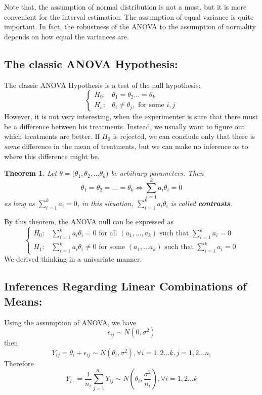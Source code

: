 \documentclass[11pt]{article}
\newtheorem{thm}{Theorem}[subsection]
\begin{document}
Note that, the assumption of normal distribution is not a must, but it is more convenient for the interval estimation. The assumption of equal variance is quite important. In fact, the robustness of the ANOVA to the assumption of normality depends on how equal the variances are. 
\subsection{The classic ANOVA Hypothesis: } 
The classic ANOVA Hypothesis is a test of the null hypothesis:
$$ \begin{cases}
	H_0: & \theta_1 = \theta_2 \dots = \theta_k  \\
	H_a: & \theta_i \neq \theta_j, \text{ for some } i, j
\end{cases}$$
However, it is not very interesting, when the experimenter is sure that there must be a difference between his treatments. Instead, we usually want to figure out which treatments are better. If $H_0$ is rejected, we can conclude only that there is \textit{ some } difference in the mean of treatments, but we can make no inference as to where this difference might be. 

\begin{thm} \label{thm: 11.2.5}
	Let $\theta = \big(\theta_1, \theta_2, \dots \theta_k \big)$ be arbitrary parameters. Then 
	$$\theta_1 = \theta_2 = \dots = \theta_k \Leftrightarrow \sum_{i = 1}^k a_i \theta_i = 0 $$
 as long as  $\sum_{i = 1}^k a_i = 0$,  in this situation, $ \sum_{i = 1}^k a_i \theta_i $ is called \textbf{contrasts}.
\end{thm}
By this theorem, the ANOVA null can be expressed as
$$\begin{cases}
	H_0: & \sum_{i = 1}^k a_i \theta_i = 0 \text{ for all } (a_1, \dots, a_k) \text{ such that } \sum_{i = 1}^k a_i = 0 \\
	H_1: & \sum_{i = 1}^k a_ i \theta_i \neq 0 \text{ for some } (a_1, \dots a_k ) \text{ such that } \sum_{i = 1}^k a_i = 0
\end{cases} $$
We derived thinking in a univariate manner.

\subsection{Inferences Regarding Linear Combinations of Means: }
Using the assumption of ANOVA, we have
$$\epsilon_{ij} \sim N(0, \sigma^2) $$
then $$Y_{ij} = \theta_i + \epsilon_{ij} \sim N(\theta_i, \sigma^2), \forall i = 1, 2 \dots k, j = 1,2 \dots n_i$$
Therefore
$$\bar{Y}_{i\cdot} = \dfrac{1}{n_i} \sum_{j = 1}^{n_i} Y_{ij} \sim N \left( \theta_i, \dfrac{\sigma^2}{n_i}\right), \forall i = 1, 2 \dots k $$
\end{document}
